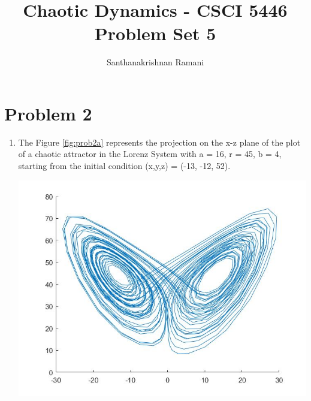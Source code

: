 \documentclass{article}
\title{\textbf{Chaotic Dynamics - CSCI 5446} \\
Problem Set 5}
\author{Santhanakrishnan Ramani}
\begin{document}
\maketitle

\section*{Problem 2}
\begin{enumerate}[label=(\alph*)]
\item 
The Figure \ref{fig:prob2a} represents the projection on the x-z plane of the plot of a chaotic attractor in the Lorenz System with a = 16, r = 45, b = 4, starting from the initial condition (x,y,z) = (-13, -12, 52).\par\medskip
\begin{minipage}{\linewidth}
{
\centering 
\includegraphics[scale=0.4]{images/prob2a.jpg}
\label{fig:prob2a}
}
\par\medskip
\end{minipage}


\end{enumerate}
\end{document}
